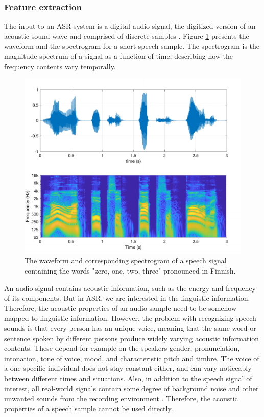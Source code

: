 \documentclass[english, 12pt, a4paper, pdftex, elec, utf8]{aaltothesis}
\begin{document}
\subsubsection{Feature extraction}

The input to an ASR system is a digital audio signal, the digitized version of an acoustic sound wave and comprised of discrete samples \cite{yu2014automatic, huang2001spoken}. Figure \ref{fig:audio} presents the waveform and the spectrogram for a short speech sample. The spectrogram is the magnitude spectrum of a signal as a function of time, describing how the frequency contents vary temporally.
\begin{figure}[t]
	\centering
	\includegraphics[trim={0cm 0.3cm 0.4cm 0.5cm}, clip, width=\textwidth]{audio.pdf}
	\caption{The waveform and corresponding spectrogram of a speech signal containing the words "zero, one, two, three" pronounced in Finnish.}
	\label{fig:audio} 
\end{figure} 
An audio signal contains acoustic information, such as the energy and frequency of its components. But in ASR, we are interested in the linguistic information. Therefore, the acoustic properties of an audio sample need to be somehow mapped to linguistic information. However, the problem with recognizing speech sounds is that every person has an unique voice, meaning that the same word or sentence spoken by different persons produce widely varying acoustic information contents. These depend for example on the speakers gender, pronunciation, intonation, tone of voice, mood, and characteristic pitch and timbre. The voice of a one specific individual does not stay constant either, and can vary noticeably between different times and situations. Also, in addition to the speech signal of interest, all real-world signals contain some degree of background noise and other unwanted sounds from the recording environment \cite{huang2001spoken}. Therefore, the acoustic properties of a speech sample cannot be used directly. \\\\
\end{document}
